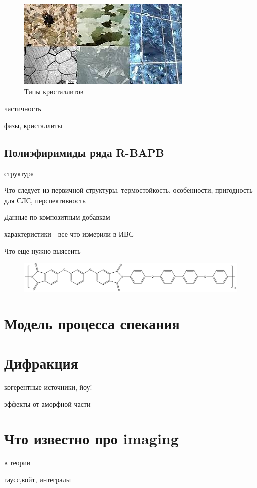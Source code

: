 \begin{figure}
    \includegraphics[width=\textwidth]{fig/crystallites.jpg}
    \caption{Типы кристаллитов}
    \label{fig:crystallites}
\end{figure}


	частичность
	
	фазы, кристаллиты
	
\subsection{Полиэфиримиды ряда R-BAPB }
структура

Что следует из первичной структуры, термостойкость, особенности, пригодность для СЛС, перспективность

Данные по композитным добавкам

характеристики - все что измерили в ИВС

Что еще нужно выясеить

		
	\begin{figure}
	\includegraphics[width=\textwidth]{fig/formula.png}
	\end{figure}
	
	\section{Модель процесса спекания}
	
	\section{Дифракция}
	когерентные источники, йоу!
	
	эффекты от аморфной части
	
	
    \section{Что известно про imaging}
    в теории
    
    гаусс,войт, интегралы
	